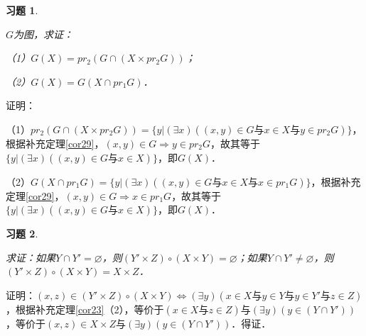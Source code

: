 \documentclass[12pt, a4paper, oneside]{book}
\newtheorem{exer}{习题}
\begin{document}
			\begin{exer}\label{exer55}
				\hfill\par
				$G$为图，求证：
				\par
				（1）$G(X)=pr_2(G\cap(X\times pr_2G))$；
				\par
				（2）$G(X)=G(X\cap pr_1G)$．
			\end{exer}
			证明：
			\par
			（1）$pr_2(G\cap(X\times pr_2G))=\{y|(\exists x)((x, y)\in G\text{与}x\in X\text{与}y\in pr_2G)\}$，根据补充定理\ref{cor29}，$(x, y)\in G\Rightarrow y\in pr_2G$，故其等于$\{y|(\exists x)((x, y)\in G\text{与}x\in X)\}$，即$G(X)$．
			\par
			（2）$G(X\cap pr_1G) =\{y|(\exists x)((x, y)\in G\text{与}x\in X\text{与}x\in pr_1G)\}$，根据补充定理\ref{cor29}，$(x, y)\in G\Rightarrow x\in pr_1G$，故其等于$\{y|(\exists x)((x, y)\in G\text{与}x\in X)\}$，即$G(X)$．
			
			\begin{exer}\label{exer56}
				\hfill\par
				求证：如果$Y\cap Y'=\varnothing$，则$(Y'\times Z)\circ (X\times Y)=\varnothing$；如果$Y\cap Y'\neq \varnothing$，则$(Y'\times Z)\circ (X\times Y)=X\times Z$．
			\end{exer}
			证明：$(x, z)\in (Y'\times Z)\circ (X\times Y)\Leftrightarrow (\exists y)(x\in X\text{与}y\in Y\text{与}y\in Y'\text{与}z\in Z)$，根据补充定理\ref{cor23}（2），等价于$(x\in X\text{与}z\in Z)\text{与}(\exists y)(y\in (Y\cap Y'))$，等价于$(x, z)\in X\times Z\text{与}(\exists y)(y\in (Y\cap Y'))$．得证．
			
\end{document}
